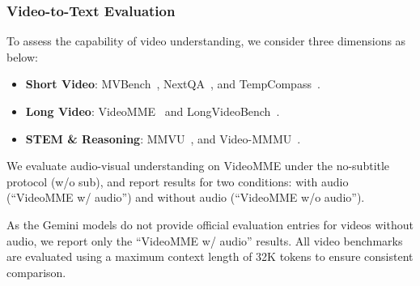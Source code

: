 \documentclass{article}
\begin{document}
\subsubsection{Video-to-Text Evaluation}
To assess the capability of video understanding, we consider three dimensions as below:
\begin{itemize}
    \item \textbf{Short Video}: MVBench~\citep{li2024mvbench}, NextQA~\citep{xiao2021nextqa}, and TempCompass~\citep{liu2024tempcompass}.
    \item \textbf{Long Video}: VideoMME~\citep{fu2024videomme} and LongVideoBench~\citep{wu2024longvideobench}.
    \item \textbf{STEM \& Reasoning}: MMVU~\citep{zhao2025mmvu}, and Video-MMMU~\citep{hu2025videommmu}.
\end{itemize}
We evaluate audio-visual understanding on VideoMME under the no-subtitle protocol (w/o sub), and report results for two conditions: with audio (“VideoMME w/ audio”) and without audio (“VideoMME w/o audio”).

As the Gemini models do not provide official evaluation entries for videos without audio, we report only the ``VideoMME w/ audio'' results.
All video benchmarks are evaluated using a maximum context length of 32K tokens to ensure consistent comparison.
\end{document}
